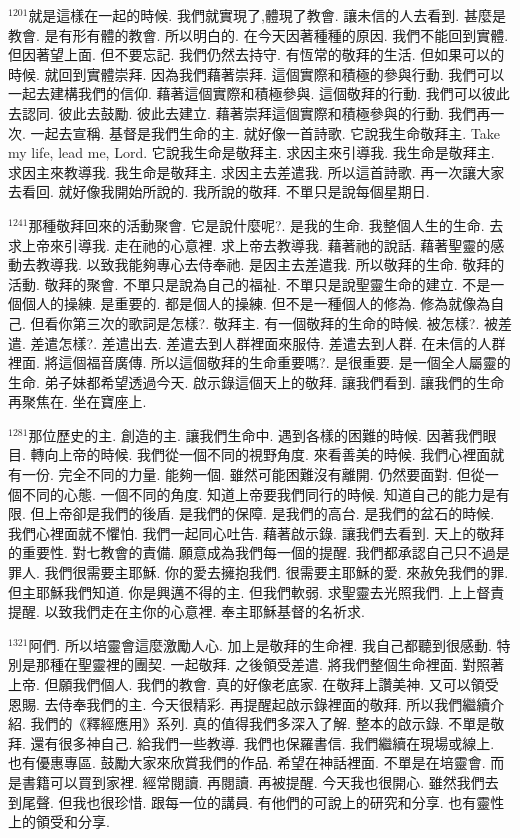 \documentclass{book}
\begin{document}
$^{1201}$就是這樣在一起的時候.
我們就實現了,體現了教會.
讓未信的人去看到.
甚麼是教會.
是有形有體的教會.
所以明白的.
在今天因著種種的原因.
我們不能回到實體.
但因著望上面.
但不要忘記.
我們仍然去持守.
有恆常的敬拜的生活.
但如果可以的時候.
就回到實體崇拜.
因為我們藉著崇拜.
這個實際和積極的參與行動.
我們可以一起去建構我們的信仰.
藉著這個實際和積極參與.
這個敬拜的行動.
我們可以彼此去認同.
彼此去鼓勵.
彼此去建立.
藉著崇拜這個實際和積極參與的行動.
我們再一次.
一起去宣稱.
基督是我們生命的主.
就好像一首詩歌.
它說我生命敬拜主.
Take my life, lead me, Lord.
它說我生命是敬拜主.
求因主來引導我.
我生命是敬拜主.
求因主來教導我.
我生命是敬拜主.
求因主去差遣我.
所以這首詩歌.
再一次讓大家去看回.
就好像我開始所說的.
我所說的敬拜.
不單只是說每個星期日.

$^{1241}$那種敬拜回來的活動聚會.
它是說什麼呢?.
是我的生命.
我整個人生的生命.
去求上帝來引導我.
走在祂的心意裡.
求上帝去教導我.
藉著祂的說話.
藉著聖靈的感動去教導我.
以致我能夠專心去侍奉祂.
是因主去差遣我.
所以敬拜的生命.
敬拜的活動.
敬拜的聚會.
不單只是說為自己的福祉.
不單只是說聖靈生命的建立.
不是一個個人的操練.
是重要的.
都是個人的操練.
但不是一種個人的修為.
修為就像為自己.
但看你第三次的歌詞是怎樣?.
敬拜主.
有一個敬拜的生命的時候.
被怎樣?.
被差遣.
差遣怎樣?.
差遣出去.
差遣去到人群裡面來服侍.
差遣去到人群.
在未信的人群裡面.
將這個福音廣傳.
所以這個敬拜的生命重要嗎?.
是很重要.
是一個全人屬靈的生命.
弟子妹都希望透過今天.
啟示錄這個天上的敬拜.
讓我們看到.
讓我們的生命再聚焦在.
坐在寶座上.

$^{1281}$那位歷史的主.
創造的主.
讓我們生命中.
遇到各樣的困難的時候.
因著我們眼目.
轉向上帝的時候.
我們從一個不同的視野角度.
來看善美的時候.
我們心裡面就有一份.
完全不同的力量.
能夠一個.
雖然可能困難沒有離開.
仍然要面對.
但從一個不同的心態.
一個不同的角度.
知道上帝要我們同行的時候.
知道自己的能力是有限.
但上帝卻是我們的後盾.
是我們的保障.
是我們的高台.
是我們的盆石的時候.
我們心裡面就不懼怕.
我們一起同心吐告.
藉著啟示錄.
讓我們去看到.
天上的敬拜的重要性.
對七教會的責備.
願意成為我們每一個的提醒.
我們都承認自己只不過是罪人.
我們很需要主耶穌.
你的愛去擁抱我們.
很需要主耶穌的愛.
來赦免我們的罪.
但主耶穌我們知道.
你是興邁不得的主.
但我們軟弱.
求聖靈去光照我們.
上上督責提醒.
以致我們走在主你的心意裡.
奉主耶穌基督的名祈求.

$^{1321}$阿們.
所以培靈會這麼激勵人心.
加上是敬拜的生命裡.
我自己都聽到很感動.
特別是那種在聖靈裡的團契.
一起敬拜.
之後領受差遣.
將我們整個生命裡面.
對照著上帝.
但願我們個人.
我們的教會.
真的好像老底家.
在敬拜上讚美神.
又可以領受恩賜.
去侍奉我們的主.
今天很精彩.
再提醒起啟示錄裡面的敬拜.
所以我們繼續介紹.
我們的《釋經應用》系列.
真的值得我們多深入了解.
整本的啟示錄.
不單是敬拜.
還有很多神自己.
給我們一些教導.
我們也保羅書信.
我們繼續在現場或線上.
也有優惠專區.
鼓勵大家來欣賞我們的作品.
希望在神話裡面.
不單是在培靈會.
而是書籍可以買到家裡.
經常閱讀.
再閱讀.
再被提醒.
今天我也很開心.
雖然我們去到尾聲.
但我也很珍惜.
跟每一位的講員.
有他們的可說上的研究和分享.
也有靈性上的領受和分享.
\end{document}
